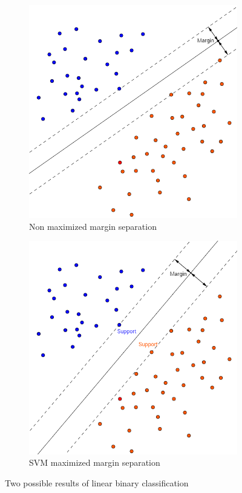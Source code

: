 \begin{figure}[t]
    \centering
    \begin{subfigure}[b]{0.45\textwidth}
        \includegraphics[width=\textwidth]{./figs/non_svm_classification_illustration}
        \caption{Non maximized margin separation}
        \label{fig:non_maximized_margin}
    \end{subfigure}
    \begin{subfigure}[b]{0.45\textwidth}
        \includegraphics[width=\textwidth]{./figs/svm_classification_illustration}
        \caption{SVM maximized margin separation}
        \label{fig:svm_maximized_margin}
    \end{subfigure}
    \caption{Two possible results of linear binary classification}
    \label{fig:classification_comparison}
\end{figure}

